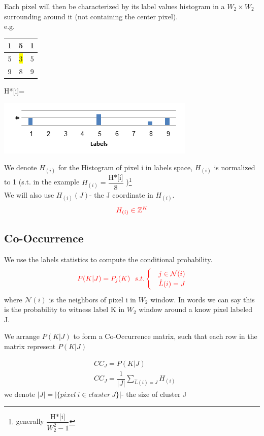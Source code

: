 \documentclass{article}
\begin{document}
Each pixel will then be characterized by its label values histogram in a $W_2\times W_2$ surrounding around it (not containing the center pixel).\\
e.g. 
\begin{multicols}{3}
\begin{tabular}{|c|c|c|}\hline
1&5&1\\	\hline
5&\colorbox{yellow}{3}&5\\ \hline
9&8&9\\ \hline
\end{tabular}

\begin{flushright}
	H*[i]=
\end{flushright}	
\includegraphics[width=0.9\linewidth]{histogram.png}
\end{multicols}
We denote $ H_{(i)} $ for the Histogram of pixel i in labels space, $ H_{(i)} $  is normalized to 1 (s.t. in the example $ H_{(i)} = \dfrac{\text{H*[i]}}{8}$ )\footnote{generally $\dfrac{\text{H*[i]}}{W_2^2-1}$ }\\
We will also use  $ H_{(i)}(J) $- the J coordinate in $ H_{(i)} $.
\begin{equation*}
\color{red} H_{(i)}\in \mathbb{Z}^K 
\end{equation*}
\subsection{Co-Occurrence}
We use the labels statistics to compute the conditional probability.
$$ \color{red}
 P(K|J)=P _j(K) \ \ s.t. \begin{cases}
&j \in {\mathcal{N}(i)}\\
&\hat{L}(i)=J
\end{cases}  $$
where $ \mathcal{N}(i) $ is the neighbors of pixel i in $ W_2 $ window.
In words we can say this is the probability to witness label K in $ W_2 $ window around a know pixel labeled J.

We arrange $ P(K|J) $ to form a Co-Occurrence matrix, such that each row in the matrix represent $ P(K|J) $

\begin{align}
&CC_J= P(K|J)\label{eq:CoOc}\\
&CC_J=\dfrac{1}{|J|} \sum_{\hat{L}(i)=J}H_{(i)}\nonumber
\end{align}
we denote $ |J|=|\{pixel\ i\in cluster\ J\}| $- the size of cluster J
\end{document}
